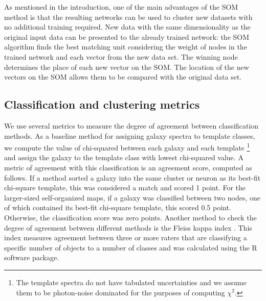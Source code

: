      As mentioned in the introduction, one of the main advantages of the SOM method is that the resulting networks can be used to cluster new datasets with no additional training required.
     New data with the same dimensionality as the original input data can be presented to the already trained network: the SOM algorithm finds the best matching unit considering the weight of nodes in the trained network and each vector from the new data set.
     The winning node determines the place of each new vector on the SOM.
     The location of the new vectors on the SOM allows them to be compared with the original data set.
     
     \subsection{Classification and clustering metrics}
     \label{sec:metrics}
     
     We use several metrics to measure the degree of agreement between classification methods. 
     As a baseline method for assigning galaxy spectra to template classes, we compute the value of chi-squared between each galaxy and each template%
\footnote{The  template spectra do not have tabulated uncertainties and we assume them to be photon-noise dominated for the purposes of computing $\chi^2$.}
     and assign the galaxy to the template class with lowest chi-squared value. 
     A metric of agreement with this classification is an agreement score, computed as follows.
    If a method sorted a galaxy into the same cluster or neuron as its best-fit chi-square template, this was considered a match and scored 1 point. 
    For the larger-sized self-organized maps, if a galaxy was classified between two nodes, one of which contained its best-fit chi-square template, this scored 0.5 point. 
    Otherwise, the classification score was zero points.     
     Another method to check the degree of agreement between different methods is the Fleiss kappa index \citet{landis77}. 
    This index measures agreement between three or more raters that are classifying a specific number of objects to a number of classes and was calculated using the R software package.

        
        
